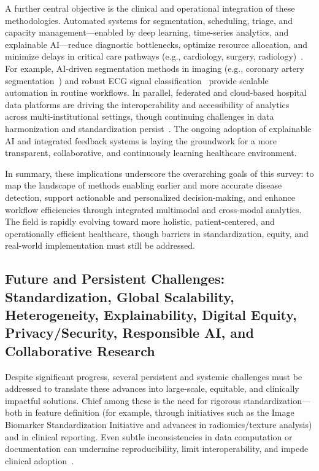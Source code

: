 \documentclass[sigconf]{acmart}
\begin{document}
A further central objective is the clinical and operational integration of these methodologies. Automated systems for segmentation, scheduling, triage, and capacity management—enabled by deep learning, time-series analytics, and explainable AI—reduce diagnostic bottlenecks, optimize resource allocation, and minimize delays in critical care pathways (e.g., cardiology, surgery, radiology)~\cite{ref49,ref72,ref73,ref74,ref75,ref76,ref100,ref101}. For example, AI-driven segmentation methods in imaging (e.g., coronary artery segmentation~\cite{ref100}) and robust ECG signal classification~\cite{ref101} provide scalable automation in routine workflows. In parallel, federated and cloud-based hospital data platforms are driving the interoperability and accessibility of analytics across multi-institutional settings, though continuing challenges in data harmonization and standardization persist~\cite{ref88,ref89}. The ongoing adoption of explainable AI and integrated feedback systems is laying the groundwork for a more transparent, collaborative, and continuously learning healthcare environment.

In summary, these implications underscore the overarching goals of this survey: to map the landscape of methods enabling earlier and more accurate disease detection, support actionable and personalized decision-making, and enhance workflow efficiencies through integrated multimodal and cross-modal analytics. The field is rapidly evolving toward more holistic, patient-centered, and operationally efficient healthcare, though barriers in standardization, equity, and real-world implementation must still be addressed.

\subsection{Future and Persistent Challenges: Standardization, Global Scalability, Heterogeneity, Explainability, Digital Equity, Privacy/Security, Responsible AI, and Collaborative Research}

Despite significant progress, several persistent and systemic challenges must be addressed to translate these advances into large-scale, equitable, and clinically impactful solutions. Chief among these is the need for rigorous standardization—both in feature definition (for example, through initiatives such as the Image Biomarker Standardization Initiative and advances in radiomics/texture analysis) and in clinical reporting. Even subtle inconsistencies in data computation or documentation can undermine reproducibility, limit interoperability, and impede clinical adoption~\cite{ref5,ref13,ref16,ref17,ref18,ref19,ref20,ref21,ref22,ref23,ref24,ref25,ref28,ref30,ref31,ref32,ref33,ref34,ref35,ref36,ref37,ref38,ref39,ref40,ref41,ref42,ref43,ref44,ref45,ref46,ref47,ref48,ref49,ref50,ref51,ref52,ref53,ref54,ref55,ref56,ref57,ref58,ref59,ref60,ref61,ref62,ref63,ref64,ref65,ref66,ref67,ref68,ref69,ref70,ref71,ref72,ref73,ref74,ref75,ref76,ref77,ref78,ref79,ref80,ref81,ref82,ref83,ref84,ref85,ref86,ref87,ref88,ref89,ref90,ref91,ref92,ref94,ref95,ref96,ref97,ref98,ref99,ref100,ref101,ref102,ref103,ref104,ref105,ref106,ref107}.
\end{document}

